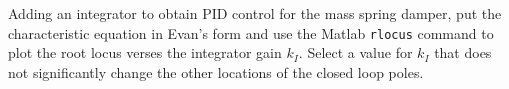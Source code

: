 Adding an integrator to obtain PID control for the mass spring damper, put the characteristic equation in Evan's form and use the Matlab {\tt rlocus} command to plot the root locus verses the integrator gain $k_I$.  Select a value for $k_I$ that does not significantly change the other locations of the closed loop poles.  

